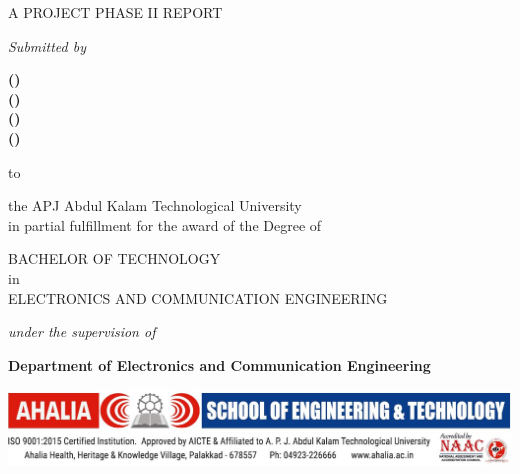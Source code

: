 \newpage
\thispagestyle{empty}

\begin{center}
	\fontsize{18}{20} \textbf{\MakeUppercase{\projname}}
	
	\vspace{0.4in}
	
	\fontsize{14}{16}
	
	{A PROJECT PHASE II REPORT}\\
	
	\vspace{0.2in}
	
	{\textit{Submitted by}}\\
	
	\vspace{0.2in}
	
	{\textbf{\MakeUppercase{\grpmema} (\memnuma)}}\\
	\vspace{0.1in}
	{\textbf{\MakeUppercase{\grpmemb} (\memnumb)}}\\
	\vspace{0.1in}
	{\textbf{\MakeUppercase{\grpmemc} (\memnumc)}}\\
	\vspace{0.1in}
	{\textbf{\MakeUppercase{\grpmemd} (\memnumd)}}\\
	
	\vspace{0.4in}
	
	{to}\\
	
	\vspace{0.2in}
	
	{the APJ Abdul Kalam Technological University\\
	in partial fulfillment for the award of the Degree of}\\
	
	\vspace{0.2in}
	
	{BACHELOR OF TECHNOLOGY\\
	in\\
	ELECTRONICS AND COMMUNICATION ENGINEERING}
	
	\vspace{0.2in}
	
	{\textit{under the supervision of}}\\
	
	\vspace{0.1in}
	
	{\textbf{\projguideCaps}}
	
	\vspace{0.4in}
	
	{\textbf{Department of Electronics and Communication Engineering}}\\
	
	\vspace{0.1in}
	
	\includegraphics[scale=0.38]{images/logo/ASETlogo.jpg}\\
	
	\vspace{0.2in}
	
	{\projdm}
\end{center}